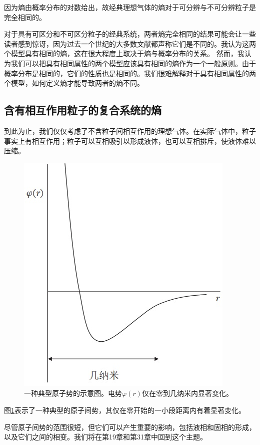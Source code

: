 \documentclass[UTF8]{ctexart}
\numberwithin{equation}{section}%
\numberwithin{figure}{section}%
\begin{document}
    因为熵由概率分布的对数给出，故经典理想气体的熵对于可分辨与不可分辨粒子是完全相同的。

    \begin{mdframed}[backgroundcolor=lightgray,hidealllines=true]
    对于具有可区分和不可区分粒子的经典系统，两者熵完全相同的结果可能会让一些读者感到惊讶，因为过去一个世纪的大多数文献都声称它们是不同的。我认为这两个模型具有相同的熵，这在很大程度上取决于熵与概率分布的关系。
    然而，我认为我们可以把具有相同属性的两个模型应该具有相同的熵作为一个一般原则。由于概率分布是相同的，它们的性质也是相同的。我们很难解释对于具有相同属性的两个模型，如何定义熵才能导致两者的熵不同。
    \end{mdframed}
    \subsection{含有相互作用粒子的复合系统的熵}
    到此为止，我们仅仅考虑了不含粒子间相互作用的理想气体。在实际气体中，粒子事实上有相互作用；粒子可以互相吸引以形成液体，也可以互相排斥，使液体难以压缩。
    \begin{figure}[ht]
        \centering
        \includegraphics{fig7.1.jpg}
        \caption{一种典型原子势的示意图。电势$\varphi(r)$仅在零到几纳米内显著变化。}
        \label{fig7.1}
    \end{figure}
    图\ref{fig7.1}表示了一种典型的原子间势，其仅在零开始的一小段距离内有着显著变化。

    尽管原子间势的范围很短，但它们可以产生重要的影响，包括液相和固相的形成，以及它们之间的相变。我们将在第19章和第31章中回到这个主题。
\end{document}
